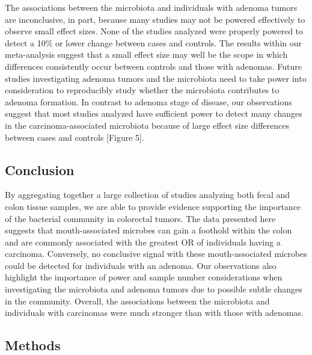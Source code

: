 \documentclass[12pt,]{article}
\begin{document}
The associations between the microbiota and individuals with adenoma
tumors are inconclusive, in part, because many studies may not be
powered effectively to observe small effect sizes. None of the studies
analyzed were properly powered to detect a 10\% or lower change between
cases and controls. The results within our meta-analysis suggest that a
small effect size may well be the scope in which differences
consistently occur between controls and those with adenomas. Future
studies investigating adenoma tumors and the microbiota need to take
power into consideration to reproducibly study whether the microbiota
contributes to adenoma formation. In contrast to adenoma stage of
disease, our observations suggest that most studies analyzed have
sufficient power to detect many changes in the carcinoma-associated
microbiota because of large effect size differences between cases and
controls {[}Figure 5{]}.

\newpage

\subsection{Conclusion}\label{conclusion}

By aggregating together a large collection of studies analyzing both
fecal and colon tissue samples, we are able to provide evidence
supporting the importance of the bacterial community in colorectal
tumors. The data presented here suggests that mouth-associated microbes
can gain a foothold within the colon and are commonly associated with
the greatest OR of individuals having a carcinoma. Conversely, no
conclusive signal with these mouth-associated microbes could be detected
for individuals with an adenoma. Our observations also highlight the
importance of power and sample number considerations when investigating
the microbiota and adenoma tumors due to possible subtle changes in the
community. Overall, the associations between the microbiota and
individuals with carcinomas were much stronger than with those with
adenomas.

\newpage

\subsection{Methods}\label{methods}
\end{document}
